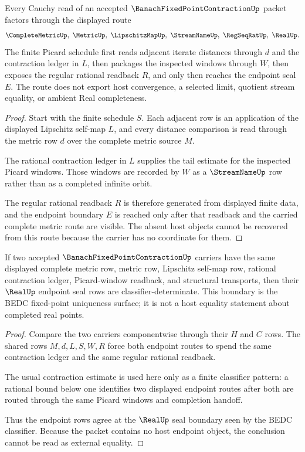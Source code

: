 \begin{theorem}
\label{thm:banach-fixed-point-contraction-iterate-cauchy-route}
Every Cauchy read of an accepted $\BanachFixedPointContractionUp$ packet factors through the displayed route
$$
\CompleteMetricUp,\ \MetricUp,\ \LipschitzMapUp,\ \StreamNameUp,\ \RegSeqRatUp,\ \RealUp .
$$
The finite Picard schedule first reads adjacent iterate distances through $d$ and the contraction ledger in $L$, then packages the inspected windows through $W$, then exposes the regular rational readback $R$, and only then reaches the endpoint seal $E$. The route does not export host convergence, a selected limit, quotient stream equality, or ambient Real completeness.
\end{theorem}
\begin{proof}
Start with the finite schedule $S$. Each adjacent row is an application of the displayed Lipschitz self-map $L$, and every distance comparison is read through the metric row $d$ over the complete metric source $M$.

The rational contraction ledger in $L$ supplies the tail estimate for the inspected Picard windows. Those windows are recorded by $W$ as a $\StreamNameUp$ row rather than as a completed infinite orbit.

The regular rational readback $R$ is therefore generated from displayed finite data, and the endpoint boundary $E$ is reached only after that readback and the carried complete metric route are visible. The absent host objects cannot be recovered from this route because the carrier has no coordinate for them.
\end{proof}

\begin{theorem}
\label{thm:banach-fixed-point-contraction-unique-fixed-point-boundary}
If two accepted $\BanachFixedPointContractionUp$ carriers have the same displayed complete metric row, metric row, Lipschitz self-map row, rational contraction ledger, Picard-window readback, and structural transports, then their $\RealUp$ endpoint seal rows are classifier-determinate. This boundary is the BEDC fixed-point uniqueness surface; it is not a host equality statement about completed real points.
\end{theorem}
\begin{proof}
Compare the two carriers componentwise through their $H$ and $C$ rows. The shared rows $M,d,L,S,W,R$ force both endpoint routes to spend the same contraction ledger and the same regular rational readback.

The usual contraction estimate is used here only as a finite classifier pattern: a rational bound below one identifies two displayed endpoint routes after both are routed through the same Picard windows and completion handoff.

Thus the endpoint rows agree at the $\RealUp$ seal boundary seen by the BEDC classifier. Because the packet contains no host endpoint object, the conclusion cannot be read as external equality.
\end{proof}

